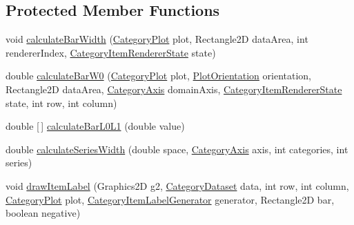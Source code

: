 \subsection*{Protected Member Functions}
\begin{DoxyCompactItemize}
\item 
void \mbox{\hyperlink{classorg_1_1jfree_1_1chart_1_1renderer_1_1category_1_1_bar_renderer_a9e384c895555031279a5200302d03af9}{calculate\+Bar\+Width}} (\mbox{\hyperlink{classorg_1_1jfree_1_1chart_1_1plot_1_1_category_plot}{Category\+Plot}} plot, Rectangle2D data\+Area, int renderer\+Index, \mbox{\hyperlink{classorg_1_1jfree_1_1chart_1_1renderer_1_1category_1_1_category_item_renderer_state}{Category\+Item\+Renderer\+State}} state)
\item 
double \mbox{\hyperlink{classorg_1_1jfree_1_1chart_1_1renderer_1_1category_1_1_bar_renderer_ac71de09da9576b58bfa64a73c9d1623b}{calculate\+Bar\+W0}} (\mbox{\hyperlink{classorg_1_1jfree_1_1chart_1_1plot_1_1_category_plot}{Category\+Plot}} plot, \mbox{\hyperlink{classorg_1_1jfree_1_1chart_1_1plot_1_1_plot_orientation}{Plot\+Orientation}} orientation, Rectangle2D data\+Area, \mbox{\hyperlink{classorg_1_1jfree_1_1chart_1_1axis_1_1_category_axis}{Category\+Axis}} domain\+Axis, \mbox{\hyperlink{classorg_1_1jfree_1_1chart_1_1renderer_1_1category_1_1_category_item_renderer_state}{Category\+Item\+Renderer\+State}} state, int row, int column)
\item 
double \mbox{[}$\,$\mbox{]} \mbox{\hyperlink{classorg_1_1jfree_1_1chart_1_1renderer_1_1category_1_1_bar_renderer_aa43824ef6bc9e5315383423d5dfe857a}{calculate\+Bar\+L0\+L1}} (double value)
\item 
double \mbox{\hyperlink{classorg_1_1jfree_1_1chart_1_1renderer_1_1category_1_1_bar_renderer_af8f74d450f6793bb618192357673e8d2}{calculate\+Series\+Width}} (double space, \mbox{\hyperlink{classorg_1_1jfree_1_1chart_1_1axis_1_1_category_axis}{Category\+Axis}} axis, int categories, int series)
\item 
void \mbox{\hyperlink{classorg_1_1jfree_1_1chart_1_1renderer_1_1category_1_1_bar_renderer_ad9f3b814b9577f00c27fbadd7a88a490}{draw\+Item\+Label}} (Graphics2D g2, \mbox{\hyperlink{interfaceorg_1_1jfree_1_1data_1_1category_1_1_category_dataset}{Category\+Dataset}} data, int row, int column, \mbox{\hyperlink{classorg_1_1jfree_1_1chart_1_1plot_1_1_category_plot}{Category\+Plot}} plot, \mbox{\hyperlink{interfaceorg_1_1jfree_1_1chart_1_1labels_1_1_category_item_label_generator}{Category\+Item\+Label\+Generator}} generator, Rectangle2D bar, boolean negative)
\end{DoxyCompactItemize}


